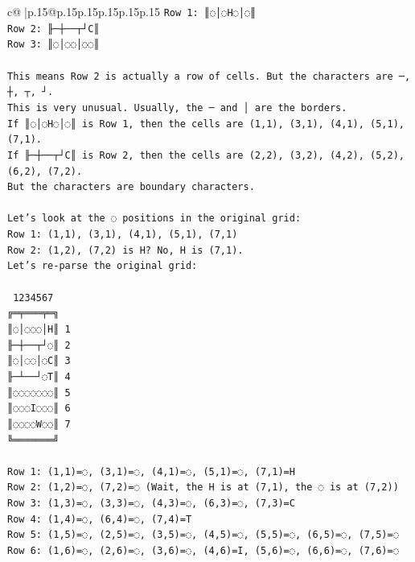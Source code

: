 \documentclass{article}
\begin{document}
{\begin{supertabular}{c@{$\;$}|p{.15\linewidth}@{}p{.15\linewidth}p{.15\linewidth}p{.15\linewidth}p{.15\linewidth}p{.15\linewidth}}
{{{\texttt{Row 1: ║◌│◌H◌│◌║} \\
\texttt{Row 2: ╟─┼──┬┘C║} \\
\texttt{Row 3: ║◌│◌◌│◌◌║} \\
\\ 
\texttt{This means Row 2 is actually a row of cells. But the characters are ─, ┼, ┬, ┘.} \\
\texttt{This is very unusual. Usually, the ─ and │ are the borders.} \\
\texttt{If ║◌│◌H◌│◌║ is Row 1, then the cells are (1,1), (3,1), (4,1), (5,1), (7,1).} \\
\texttt{If ╟─┼──┬┘C║ is Row 2, then the cells are (2,2), (3,2), (4,2), (5,2), (6,2), (7,2).} \\
\texttt{But the characters are boundary characters.} \\
\\ 
\texttt{Let's look at the ◌ positions in the original grid:} \\
\texttt{Row 1: (1,1), (3,1), (4,1), (5,1), (7,1)} \\
\texttt{Row 2: (1,2), (7,2) is H? No, H is (7,1).} \\
\texttt{Let's re{-}parse the original grid:} \\
\\ 
\texttt{ 1234567} \\
\texttt{╔═╤═══╤═╗} \\
\texttt{║◌│◌◌◌│H║ 1} \\
\texttt{╟─┼──┬┘◌║ 2} \\
\texttt{║◌│◌◌│◌C║ 3} \\
\texttt{╟─┴──┘◌T║ 4} \\
\texttt{║◌◌◌◌◌◌◌║ 5} \\
\texttt{║◌◌◌I◌◌◌║ 6} \\
\texttt{║◌◌◌◌W◌◌║ 7} \\
\texttt{╚═══════╝} \\
\\ 
\texttt{Row 1: (1,1)=◌, (3,1)=◌, (4,1)=◌, (5,1)=◌, (7,1)=H} \\
\texttt{Row 2: (1,2)=◌, (7,2)=◌ (Wait, the H is at (7,1), the ◌ is at (7,2))} \\
\texttt{Row 3: (1,3)=◌, (3,3)=◌, (4,3)=◌, (6,3)=◌, (7,3)=C} \\
\texttt{Row 4: (1,4)=◌, (6,4)=◌, (7,4)=T} \\
\texttt{Row 5: (1,5)=◌, (2,5)=◌, (3,5)=◌, (4,5)=◌, (5,5)=◌, (6,5)=◌, (7,5)=◌} \\
\texttt{Row 6: (1,6)=◌, (2,6)=◌, (3,6)=◌, (4,6)=I, (5,6)=◌, (6,6)=◌, (7,6)=◌} \\
}}}
\end{supertabular}}
\end{document}
